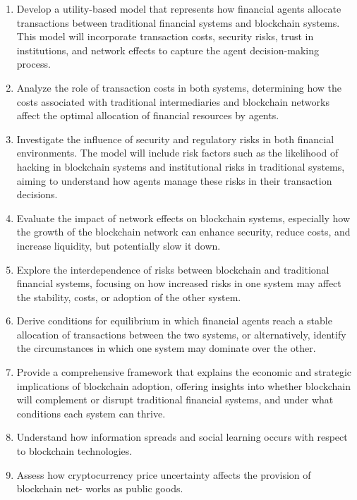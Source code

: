 \begin{enumerate}
\item Develop a utility-based model that represents how financial agents allocate transactions between traditional financial systems and blockchain systems. This model will incorporate transaction costs, security risks, trust in institutions, and network effects to capture the agent decision-making process.

\item Analyze the role of transaction costs in both systems, determining how the costs associated with traditional intermediaries and blockchain networks affect the optimal allocation of financial resources by agents.

\item Investigate the influence of security and regulatory risks in both financial environments. The model will include risk factors such as the likelihood of hacking in blockchain systems and institutional risks in traditional systems, aiming to understand how agents manage these risks in their transaction decisions.

\item Evaluate the impact of network effects on blockchain systems, especially how the growth of the blockchain network can enhance security, reduce costs, and increase liquidity, but potentially slow it down.

\item Explore the interdependence of risks between blockchain and traditional financial systems, focusing on how increased risks in one system may affect the stability, costs, or adoption of the other system.

\item Derive conditions for equilibrium in which financial agents reach a stable allocation of transactions between the two systems, or alternatively, identify the circumstances in which one system may dominate over the other.

\item Provide a comprehensive framework that explains the economic and strategic implications of blockchain adoption, offering insights into whether blockchain will complement or disrupt traditional financial systems, and under what conditions each system can thrive.

\item Understand how information spreads and social learning occurs with respect to blockchain
technologies.

\item Assess how cryptocurrency price uncertainty affects the provision of blockchain net-
works as public goods.
\end{enumerate}


